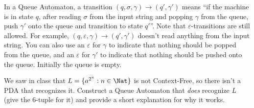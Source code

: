 \documentclass[solution, letterpaper]{cs121}
\begin{document}
In a Queue Automaton, a transition $(q, \sigma, \gamma)\rightarrow (q',
\gamma')$ means ``if the machine is in state $q$, after reading $\sigma$ from
the input string and popping $\gamma$ from the queue, push
$\gamma'$ onto the queue and transition to state $q'$''. Note that
$\varepsilon$-transitions are still allowed. For example, $(q, \varepsilon,
\gamma)\rightarrow (q', \gamma')$ doesn't read anything from the input string.
You can also use an $\varepsilon$ for $\gamma$ to indicate that nothing should
be popped from the queue, and an $\varepsilon$ for $\gamma'$ to indicate that
nothing should be pushed onto the queue. Initially the queue is empty.

We saw in class that $L=\{a^{2^n} : n \in \Nat \}$ is not Context-Free, so
there isn't a PDA that recognizes it. Construct a Queue Automaton that {\em
does} recognize $L$ (give the 6-tuple for it) and provide a short explanation
for why it works.
\end{document}
